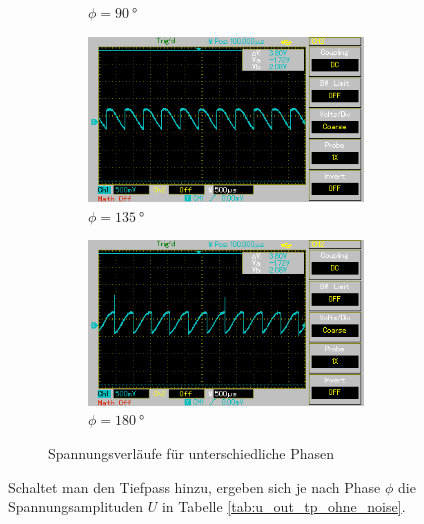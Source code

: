 \begin{figure}
\begin{subfigure}{0.5\textwidth}
    \caption{$\phi = \qty[]{90}{\degree}$}%
    \label{fig:phase3}%
    \end{subfigure}%
    \hfill%
    \begin{subfigure}{0.5\textwidth}%
    \centering%
    \includegraphics[width = 7.3cm]{./Oszilloskop Bilder/png/5.2/4 MAP005.png}%
    \caption{$\phi = \qty[]{135}{\degree}$}%
    \label{fig:phase4}%
    \end{subfigure}%
    \hfill
    \begin{subfigure}{0.5\textwidth}%
    \centering%
    \includegraphics[width = 7.3cm]{./Oszilloskop Bilder/png/5.2/5 MAP006.png}%
    \caption{$\phi = \qty[]{180}{\degree}$}%
    \label{fig:phase5}%
    \end{subfigure}%
    \caption{Spannungsverläufe für unterschiedliche Phasen}%
    \label{fig:phasenunterschiede}%
\end{figure}%
%  
%
Schaltet man den Tiefpass hinzu, ergeben sich je nach Phase $\phi$ die Spannungsamplituden $U$ in Tabelle \ref{tab:u_out_tp_ohne_noise}.


